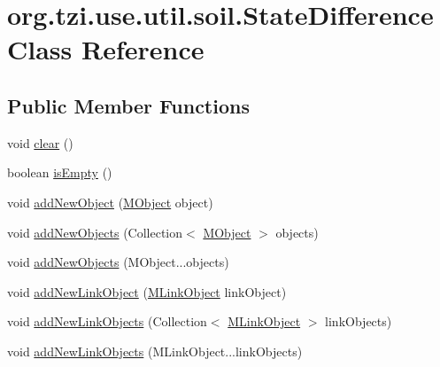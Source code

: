 \hypertarget{classorg_1_1tzi_1_1use_1_1util_1_1soil_1_1_state_difference}{\section{org.\-tzi.\-use.\-util.\-soil.\-State\-Difference Class Reference}
\label{classorg_1_1tzi_1_1use_1_1util_1_1soil_1_1_state_difference}
}
\subsection*{Public Member Functions}
\begin{DoxyCompactItemize}
\item 
void \hyperlink{classorg_1_1tzi_1_1use_1_1util_1_1soil_1_1_state_difference_a26a11d3cb8c53a32a87f1a1a23c31716}{clear} ()
\item 
boolean \hyperlink{classorg_1_1tzi_1_1use_1_1util_1_1soil_1_1_state_difference_ad112f8dedae36207b6702c249b7539e7}{is\-Empty} ()
\item 
void \hyperlink{classorg_1_1tzi_1_1use_1_1util_1_1soil_1_1_state_difference_a73807b8b38578860549108795cd3e8fa}{add\-New\-Object} (\hyperlink{interfaceorg_1_1tzi_1_1use_1_1uml_1_1sys_1_1_m_object}{M\-Object} object)
\item 
void \hyperlink{classorg_1_1tzi_1_1use_1_1util_1_1soil_1_1_state_difference_a1611a19da7eba9b5de53f82b156cf8b9}{add\-New\-Objects} (Collection$<$ \hyperlink{interfaceorg_1_1tzi_1_1use_1_1uml_1_1sys_1_1_m_object}{M\-Object} $>$ objects)
\item 
void \hyperlink{classorg_1_1tzi_1_1use_1_1util_1_1soil_1_1_state_difference_a19db19f94821d56d9260edb3e5acdf51}{add\-New\-Objects} (M\-Object...\-objects)
\item 
void \hyperlink{classorg_1_1tzi_1_1use_1_1util_1_1soil_1_1_state_difference_a9ee0866dfe5a1dcd906bbd881a87d51a}{add\-New\-Link\-Object} (\hyperlink{interfaceorg_1_1tzi_1_1use_1_1uml_1_1sys_1_1_m_link_object}{M\-Link\-Object} link\-Object)
\item 
void \hyperlink{classorg_1_1tzi_1_1use_1_1util_1_1soil_1_1_state_difference_aac854bc09756e852d25b5f9fa581359c}{add\-New\-Link\-Objects} (Collection$<$ \hyperlink{interfaceorg_1_1tzi_1_1use_1_1uml_1_1sys_1_1_m_link_object}{M\-Link\-Object} $>$ link\-Objects)
\item 
void \hyperlink{classorg_1_1tzi_1_1use_1_1util_1_1soil_1_1_state_difference_ac057af39a6014da1f48ac571cfedcaa9}{add\-New\-Link\-Objects} (M\-Link\-Object...\-link\-Objects)

\end{DoxyCompactItemize}
